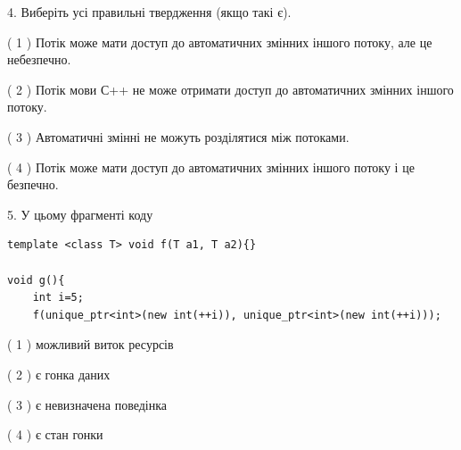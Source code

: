 \documentclass[12pt, ukrainian]{article}
\begin{document}
\begin {large}
{%
4. Виберіть усі правильні твердження (якщо такі є).\par
\vspace{2mm}

( 1 ) Потік може мати доступ до автоматичних змінних іншого потоку, але це небезпечно.%

( 2 ) Потік мови С++ не може отримати доступ до автоматичних змінних іншого потоку.%

( 3 ) Автоматичні змінні не можуть розділятися між потоками.%

( 4 ) Потік може мати доступ до автоматичних змінних іншого потоку і це безпечно.%


5. У цьому фрагменті коду
\begin{verbatim}
template <class T> void f(T a1, T a2){}

void g(){
    int i=5;
    f(unique_ptr<int>(new int(++i)), unique_ptr<int>(new int(++i)));
\end{verbatim}

( 1 ) можливий виток ресурсів%

( 2 ) є гонка даних%

( 3 ) є невизначена поведінка%

( 4 ) є стан гонки%
}
\end {large}
\end{document}
